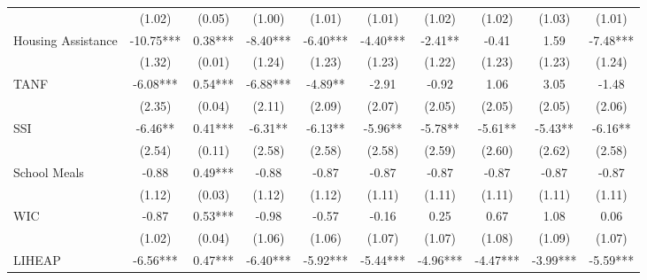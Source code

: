 \begin{table}[]
\begin{tabular*}{1.36\textwidth}{@{\extracolsep{\fill}}lccccccccc}
                   & (1.02)        & (0.05)        & (1.00)        & (1.01)        & (1.01)        & (1.02)        & (1.02)        & (1.03)        & (1.01)     \\
\addlinespace
Housing Assistance & -10.75***          & 0.38***          & -8.40***          & -6.40***          & -4.40***          & -2.41**          & -0.41          & 1.59          & -7.48*** \\
                   & (1.32)              & (0.01)              & (1.24)              & (1.23)              & (1.23)              & (1.22)              & (1.23)              & (1.23)              & (1.24)     \\
\addlinespace
TANF               & -6.08***        & 0.54***        & -6.88***        & -4.89**        & -2.91        & -0.92        & 1.06        & 3.05        & -1.48 \\
                   & (2.35)            & (0.04)            & (2.11)            & (2.09)            & (2.07)            & (2.05)            & (2.05)            & (2.05)            & (2.06)     \\
\addlinespace
SSI                & -6.46**         & 0.41***         & -6.31**         & -6.13**         & -5.96**         & -5.78**         & -5.61**         & -5.43**         & -6.16** \\
                   & (2.54)             & (0.11)             & (2.58)             & (2.58)             & (2.58)             & (2.59)             & (2.60)             & (2.62)             & (2.58)     \\
\addlinespace
School Meals       & -0.88 & 0.49*** & -0.88 & -0.87 & -0.87 & -0.87 & -0.87 & -0.87 & -0.87 \\
                   & (1.12)     & (0.03)     & (1.12)     & (1.12)     & (1.11)     & (1.11)     & (1.11)     & (1.11)     & (1.11)     \\
\addlinespace
WIC                & -0.87         & 0.53***         & -0.98         & -0.57         & -0.16         & 0.25         & 0.67         & 1.08         & 0.06 \\
                   & (1.02)             & (0.04)             & (1.06)             & (1.06)             & (1.07)             & (1.07)             & (1.08)             & (1.09)             & (1.07)     \\
\addlinespace
LIHEAP             & -6.56***      & 0.47***      & -6.40***      & -5.92***      & -5.44***      & -4.96***      & -4.47***      & -3.99***      & -5.59*** \\

\end{tabular*}
\end{table}
